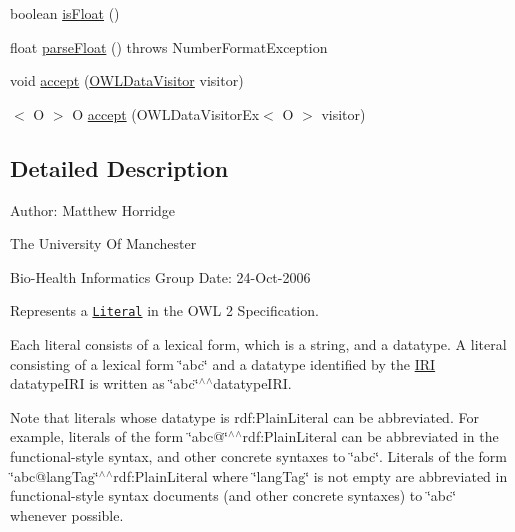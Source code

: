 \begin{DoxyCompactItemize}
\item 
boolean \hyperlink{interfaceorg_1_1semanticweb_1_1owlapi_1_1model_1_1_o_w_l_literal_add8635d408673cb5d834f6a5be251e8d}{is\-Float} ()
\item 
float \hyperlink{interfaceorg_1_1semanticweb_1_1owlapi_1_1model_1_1_o_w_l_literal_ae3584fbe764abc400fc1c99c8852b5e9}{parse\-Float} ()  throws Number\-Format\-Exception
\item 
void \hyperlink{interfaceorg_1_1semanticweb_1_1owlapi_1_1model_1_1_o_w_l_literal_a04b198a40eea258c2fe29a27ee3b1a62}{accept} (\hyperlink{interfaceorg_1_1semanticweb_1_1owlapi_1_1model_1_1_o_w_l_data_visitor}{O\-W\-L\-Data\-Visitor} visitor)
\item 
$<$ O $>$ O \hyperlink{interfaceorg_1_1semanticweb_1_1owlapi_1_1model_1_1_o_w_l_literal_aa9e36d3473c30c19b179eaa12e5d4347}{accept} (O\-W\-L\-Data\-Visitor\-Ex$<$ O $>$ visitor)
\end{DoxyCompactItemize}


\subsection{Detailed Description}
Author\-: Matthew Horridge\par
 The University Of Manchester\par
 Bio-\/\-Health Informatics Group Date\-: 24-\/\-Oct-\/2006 

Represents a \href{http://www.w3.org/TR/2009/REC-owl2-syntax-20091027/#Literals}{\tt Literal} in the O\-W\-L 2 Specification. 

Each literal consists of a lexical form, which is a string, and a datatype. A literal consisting of a lexical form {\ttfamily \char`\"{}abc\char`\"{}} and a datatype identified by the \hyperlink{classorg_1_1semanticweb_1_1owlapi_1_1model_1_1_i_r_i}{I\-R\-I} {\ttfamily datatype\-I\-R\-I} is written as {\ttfamily \char`\"{}abc\char`\"{}$^\wedge$$^\wedge$datatype\-I\-R\-I}. 

Note that literals whose datatype is {\ttfamily rdf\-:Plain\-Literal} can be abbreviated. For example, literals of the form {\ttfamily \char`\"{}abc@\char`\"{}$^\wedge$$^\wedge$rdf\-:Plain\-Literal} can be abbreviated in the functional-\/style syntax, and other concrete syntaxes to \char`\"{}abc\char`\"{}. Literals of the form \char`\"{}abc@lang\-Tag\char`\"{}$^\wedge$$^\wedge$rdf\-:Plain\-Literal where \char`\"{}lang\-Tag\char`\"{} is not empty are abbreviated in functional-\/style syntax documents (and other concrete syntaxes) to \char`\"{}abc\char`\"{} whenever possible. 


